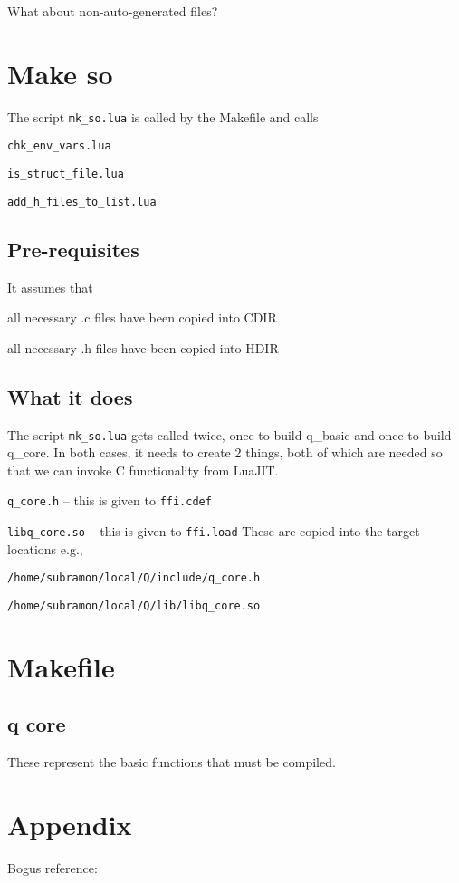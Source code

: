 What about non-auto-generated files? \TBC

\section{Make so}

The script {\tt mk\_so.lua} is called by the Makefile and calls
\be 
\item {\tt chk\_env\_vars.lua}
\item {\tt is\_struct\_file.lua}
\item {\tt add\_h\_files\_to\_list.lua}
\ee

\subsection{Pre-requisites}
It assumes that 
\be
\item all necessary .c files have been copied into CDIR
\item all necessary .h files have been copied into HDIR
\ee

\subsection{What it does}

The script \verb+mk_so.lua+ gets called twice, 
once to build q\_basic and once to build q\_core.
In both cases, it needs to create 2 things, both of which are needed so that we
can invoke C functionality from LuaJIT.
\be
\item \verb+q_core.h+ -- this is given to {\tt ffi.cdef}
\item \verb+libq_core.so+ -- this is given to {\tt ffi.load}
\ee
These are copied into the target locations e.g.,
\be
\item \verb+/home/subramon/local/Q/include/q_core.h+
\item \verb+/home/subramon/local/Q/lib/libq_core.so+
\ee

\section{Makefile}

\subsection{q core}
\label{q_core}

These represent the basic functions that must be compiled.

\section{Appendix}

Bogus reference: \cite{sarawagi99}

 




